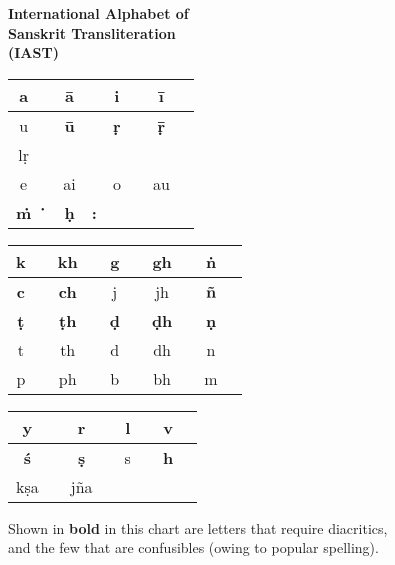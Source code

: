 \thispagestyle{empty}
\begin{center}
{\LARGE\bfseries International Alphabet of\\[3pt] Sanskrit Transliteration\\[8pt] (IAST)}
\vskip 30pt

\bgroup
\fontsize{11}{14pt}\selectfont
\renewcommand{\arraystretch}{1.5}
\begin{tabular}{|c|c!{\vrule width 0.8pt}c|c!{\vrule width 0.8pt}c|c!{\vrule width 0.8pt}c|c|}
\hline
a &  & {\bf ā} &  & i &  & {\bf ī} & \\
\hline
u &      & {\bf ū} &  & {\bf ṛ} &  & {\bf ṝ} &  \\
\hline
lṛ &    &     &                       &     &                       &      & \\
\hline
e &  & ai &  & o &  & au & \\
\hline
{\bf ṁ} &  {\bf‍\.{\phantom{i}}}  & {\bf ḥ}  & {\bf :}         &   &            &   & \\  	
\hline
\end{tabular}
\vskip 20pt

\begin{tabular}{|c|c!{\vrule width 0.8pt}c|c!{\vrule width 0.8pt}c|c!{\vrule width 0.8pt}c|c!{\vrule width 0.8pt}c|c|}
\hline
k &  & kh &  & g &  & gh &  & {\bf ṅ} & \\
\hline
{\bf c} &  & {\bf ch} &  & j &  & jh &   & {\bf ñ} &  \\
\hline
{\bf ṭ} &  & {\bf ṭh} &  & {\bf ḍ} &   & {\bf ḍh} &  & {\bf ṇ} &   \\
\hline
t &   & th &   & d &  & dh &   & n &  \\
\hline
p &  & ph &  & b &  & bh &   & m &  \\ 
\hline
\end{tabular}
\vskip 20pt

\begin{tabular}{|c|c!{\vrule width 0.8pt}c|c!{\vrule width 0.8pt}c|c!{\vrule width 0.8pt}c|c|}
\hline
y &      & r   &  & l &  & v &  \\
\hline
{\bf ś} &    & {\bf ṣ}   &  & s &  & {\bf h} &  \\
\hline
kṣa &  & jña &  &    &    &   &  \\
\hline
\end{tabular}
\egroup
\end{center}

Shown in \textbf{bold} in this chart are letters that require diacritics,\\ and the few that are confusibles (owing to popular spelling).
